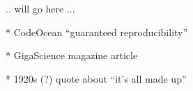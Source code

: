.. will go here ... 


* CodeOcean ``guaranteed reproducibility'' 

* GigaScience magazine article 

* 1920s (?) quote about ``it's all made up''  